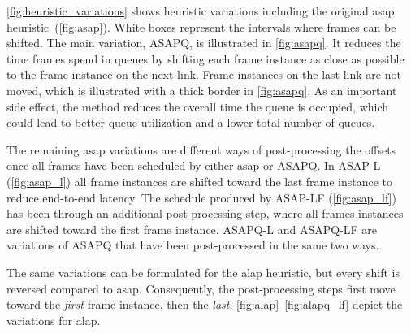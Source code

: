 \autoref{fig:heuristic_variations} shows heuristic variations including the original \gls{asap} heuristic~(\autoref{fig:asap}). White boxes represent the intervals where frames can be shifted.
The main variation, ASAPQ, is illustrated in \autoref{fig:asapq}. It reduces the time frames spend in queues by shifting each frame instance as close as possible to the frame instance on the next link. Frame instances on the last link are not moved, which is illustrated with a thick border in \autoref{fig:asapq}. As an important side effect, the method reduces the overall time the queue is occupied, which could lead to better queue utilization and a lower total number of queues.

The remaining \gls{asap} variations are different ways of post-proces\-sing the offsets once all frames have been scheduled by either \gls{asap} or ASAPQ. In ASAP-L (\autoref{fig:asap_l}) all frame instances are shifted toward the last frame instance to reduce end-to-end latency. The schedule produced by ASAP-LF (\autoref{fig:asap_lf}) has been through an additional post-processing step, where all frames instances are shifted toward the first frame instance. ASAPQ-L and ASAPQ-LF are variations of ASAPQ that have been post-processed in the same two ways.

The same variations can be formulated for the \gls{alap} heuristic, but every shift is reversed compared to \gls{asap}. Consequently, the post-processing steps first move toward the \emph{first} frame instance, then the \emph{last}. \autoref{fig:alap}--\ref{fig:alapq_lf} depict the variations for \gls{alap}.

